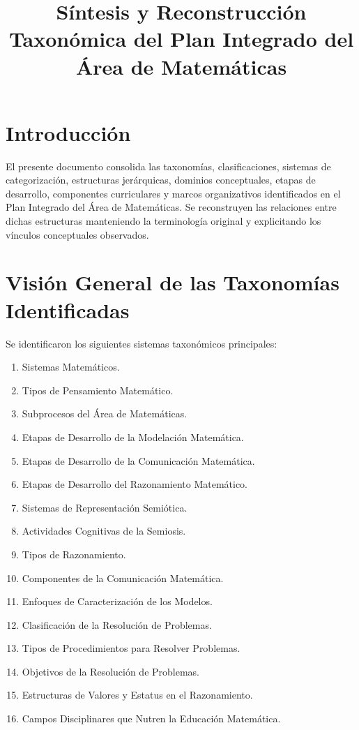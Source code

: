 \documentclass[11pt,a4paper]{article}
\title{Síntesis y Reconstrucción Taxonómica del Plan Integrado del Área de Matemáticas}
\author{}
\date{}
\begin{document}
	
	\maketitle
	
	\section*{Introducción}
	
	El presente documento consolida las taxonomías, clasificaciones, sistemas de categorización, estructuras jerárquicas, dominios conceptuales, etapas de desarrollo, componentes curriculares y marcos organizativos identificados en el Plan Integrado del Área de Matemáticas. Se reconstruyen las relaciones entre dichas estructuras manteniendo la terminología original y explicitando los vínculos conceptuales observados.
	
	\tableofcontents
	\newpage
	
	\section{Visión General de las Taxonomías Identificadas}
	
	Se identificaron los siguientes sistemas taxonómicos principales:
	
	\begin{enumerate}
		\item Sistemas Matemáticos.
		\item Tipos de Pensamiento Matemático.
		\item Subprocesos del Área de Matemáticas.
		\item Etapas de Desarrollo de la Modelación Matemática.
		\item Etapas de Desarrollo de la Comunicación Matemática.
		\item Etapas de Desarrollo del Razonamiento Matemático.
		\item Sistemas de Representación Semiótica.
		\item Actividades Cognitivas de la Semiosis.
		\item Tipos de Razonamiento.
		\item Componentes de la Comunicación Matemática.
		\item Enfoques de Caracterización de los Modelos.
		\item Clasificación de la Resolución de Problemas.
		\item Tipos de Procedimientos para Resolver Problemas.
		\item Objetivos de la Resolución de Problemas.
		\item Estructuras de Valores y Estatus en el Razonamiento.
		\item Campos Disciplinares que Nutren la Educación Matemática.
	\end{enumerate}
	
\end{document}
